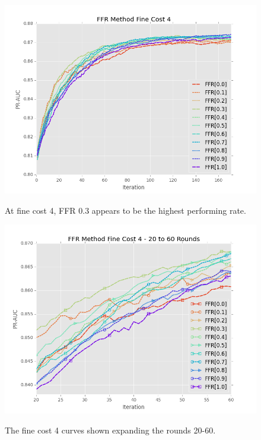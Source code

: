 \documentclass[ms]{nuthesis}
\begin{document}
\FloatBarrier
\begin{figure}[!htb]
	\centering
    \includegraphics[width=1.0\columnwidth]{fig/FFR_PR_Cost4_rnds0_171}
    \label{fig:FFR_PR_Cost4_rnds0_171}
    \caption{At fine cost 4, FFR 0.3 appears to be the highest performing rate.}
\end{figure}
\FloatBarrier


\FloatBarrier
\begin{figure}[!htb]
	\centering
    \includegraphics[width=1.0\columnwidth]{fig/FFR_PR_Cost4_rnds20_60}
    \label{fig:FFR_PR_Cost4_rnds20_60}
    \caption{The fine cost 4 curves shown expanding the rounds 20-60.}
\end{figure}
\FloatBarrier
\end{document}

